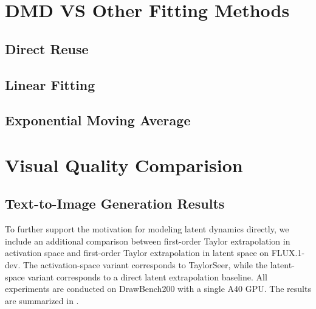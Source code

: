 \section{%
DMD VS Other Fitting Methods}

\subsection{Direct Reuse}

\subsection{Linear Fitting}

\subsection{Exponential Moving Average}


\section{Visual Quality Comparision}

\subsection{Text-to-Image Generation Results}

To further support the motivation for modeling latent dynamics directly,
we include an additional comparison
between first-order Taylor extrapolation in activation space
and first-order Taylor extrapolation in latent space on FLUX.1-dev.
The activation-space variant corresponds to TaylorSeer,
while the latent-space variant corresponds to a direct latent extrapolation baseline.
All experiments are conducted on DrawBench200 with a single A40 GPU.
The results are summarized in .

